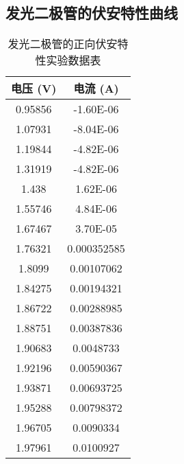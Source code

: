 \documentclass[UTF-8,twoside,cs4size]{ctexart}
\begin{document}
    \subsection{发光二极管的伏安特性曲线}   
    \begin{table}[htbp]
        \centering
        \begin{tabular}{|c|c|}
        \hline
        电压 (V)    & 电流 (A)    \\ \hline
        0.95856    & -1.60E-06    \\ \hline
        1.07931    & -8.04E-06    \\ \hline
        1.19844    & -4.82E-06    \\ \hline
        1.31919    & -4.82E-06    \\ \hline
        1.438      & 1.62E-06     \\ \hline
        1.55746    & 4.84E-06     \\ \hline
        1.67467    & 3.70E-05     \\ \hline
        1.76321    & 0.000352585  \\ \hline
        1.8099     & 0.00107062   \\ \hline
        1.84275    & 0.00194321   \\ \hline
        1.86722    & 0.00288985   \\ \hline
        1.88751    & 0.00387836   \\ \hline
        1.90683    & 0.0048733    \\ \hline
        1.92196    & 0.00590367   \\ \hline
        1.93871    & 0.00693725   \\ \hline
        1.95288    & 0.00798372   \\ \hline
        1.96705    & 0.0090334    \\ \hline
        1.97961    & 0.0100927    \\ \hline
        \end{tabular}
        \caption{发光二极管的正向伏安特性实验数据表}
        \end{table}
        \newpage
\end{document}
